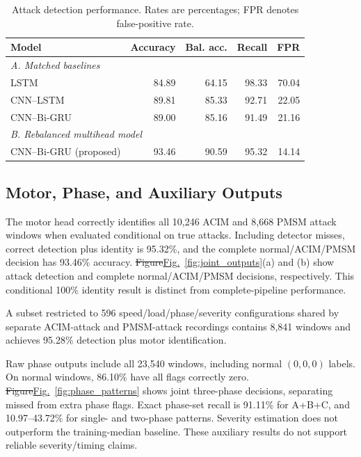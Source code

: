 \documentclass[conference,letterpaper]{IEEEtran}
\providecommand{\DIFadd}[1]{{\protect\color{blue}\uline{#1}}} %
\providecommand{\DIFdel}[1]{{\protect\color{red}\sout{#1}}}                      %
\providecommand{\DIFaddbegin}{} %
\providecommand{\DIFaddend}{} %
\providecommand{\DIFdelbegin}{} %
\providecommand{\DIFdelend}{} %
\begin{document}
\begin{table}[!t]
\centering
\caption{Attack detection performance. Rates are percentages; FPR denotes false-positive rate. }
\label{tab:comparison}
\setlength{\tabcolsep}{3pt}
\small
\begin{tabular}{lrrrr}
\toprule
Model & Accuracy & Bal. acc. & Recall & FPR \\
\midrule
\multicolumn{5}{l}{\textit{A. Matched baselines}} \\
LSTM & 84.89 & 64.15 & 98.33 & 70.04 \\
CNN--LSTM & 89.81 & 85.33 & 92.71 & 22.05 \\
CNN--Bi-GRU & 89.00 & 85.16 & 91.49 & 21.16 \\
\midrule
\multicolumn{5}{l}{\textit{B. Rebalanced multihead model}} \\
CNN--Bi-GRU (proposed) & 93.46 & 90.59 & 95.32 & 14.14 \\
\bottomrule
\end{tabular}
\end{table}


















\subsection{Motor, Phase, and Auxiliary Outputs}
The motor head correctly identifies all 10,246 ACIM and 8,668 PMSM attack windows when evaluated conditional on true attacks. Including detector misses, correct detection plus identity is 95.32\%, and the complete normal/ACIM/PMSM decision has 93.46\% accuracy. \DIFdelbegin \DIFdel{Figure}\DIFdelend \DIFaddbegin \DIFadd{Fig.}\DIFaddend ~\ref{fig:joint_outputs}(a) and (b) show attack detection and complete normal/ACIM/PMSM decisions, respectively. This conditional 100\% identity result is distinct from complete-pipeline performance.

A subset restricted to 596 speed/load/phase/severity configurations shared by separate ACIM-attack and PMSM-attack recordings contains 8,841 windows and achieves 95.28\% detection plus motor identification.

Raw phase outputs include all 23,540 windows, including normal $(0,0,0)$ labels. On normal windows, 86.10\% have all flags correctly zero. \DIFdelbegin \DIFdel{Figure}\DIFdelend \DIFaddbegin \DIFadd{Fig.}\DIFaddend ~\ref{fig:phase_patterns} shows joint three-phase decisions, separating missed from extra phase flags. Exact phase-set recall is 91.11\% for A+B+C, and 10.97--43.72\% for single- and two-phase patterns. Severity estimation does not outperform the training-median baseline. These auxiliary results do not support reliable severity/timing claims.
\end{document}
